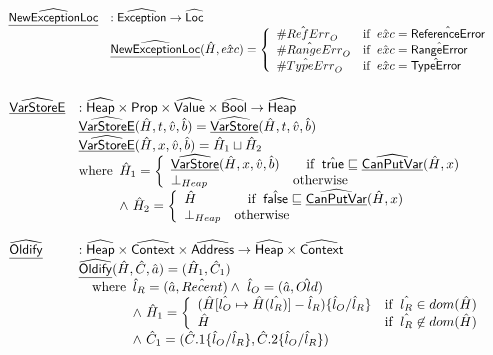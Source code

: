\documentclass{article}
\newcommand{\SF}[1]{\mbox{\textsf{#1}}}
\newcommand{\wherec}[1]{{\rm where}\begin{array}[t]{l}#1\end{array}}
\newcommand{\ifc}[1]{{\rm if}\begin{array}[t]{l}#1\end{array}}
\newcommand{\owc}{{\rm otherwise}}
\newcommand{\Prop}{\SF{Prop}}
\newcommand{\abs}[1]{\widehat{\SF{#1}}}
\newcommand{\aHeap}{\abs{Heap}}
\newcommand{\aValue}{\abs{Value}}
\newcommand{\ahf}[1]{\widehat{\underline{\sf #1}}}
\newcommand{\exc}[1]{{\sf #1}}
\newcommand{\avarloc}[1]{\hat{\##1}}
\newcommand{\atrue}{\hat{\SF{true}}}
\newcommand{\afalse}{\hat{\SF{false}}}
\begin{document}
\[\begin{array}{ll}
\ahf{NewExceptionLoc} & : \abs{Exception} \rightarrow \abs{Loc} \\
 & \ahf{NewExceptionLoc}(\hat{H},\hat{exc}) =
 \left\{
   \begin{array}{ll}
     \avarloc{RefErr}_O & \ifc{\hat{exc} = \hat{\exc{ReferenceError}}} \\
     \avarloc{RangeErr}_O & \ifc{\hat{exc} = \hat{\exc{RangeError}}} \\
     \avarloc{TypeErr}_O & \ifc{\hat{exc} = \hat{\exc{TypeError}}} \\
   \end{array}
 \right.\\
\\
\end{array}
\]
\[
\begin{array}{ll}
\ahf{VarStoreE} & : \aHeap \times \Prop \times \aValue \times \abs{Bool} \rightarrow \aHeap\\
& \ahf{VarStoreE}(\hat{H}, t, \hat{v}, \hat{b}) = \ahf{VarStore}(\hat{H}, t, \hat{v}, \hat{b}) \\
& \ahf{VarStoreE}(\hat{H}, x, \hat{v}, \hat{b}) = \hat{H}_1 \sqcup \hat{H}_2 \\
& \wherec{
  \hat{H}_1 = \left\{
    \begin{array}{ll}
      \ahf{VarStore}(\hat{H}, x, \hat{v}, \hat{b}) & \quad\ifc{\atrue\sqsubseteq\ahf{CanPutVar}(\hat{H}, x)} \\
      \bot_{Heap} & \owc
    \end{array}
  \right. \\
  \land\ \hat{H}_2 = \left\{
    \begin{array}{ll}
      \hat{H} & \quad\ifc{\afalse \sqsubseteq \ahf{CanPutVar}(\hat{H}, x)} \\
      \bot_{Heap} & \owc
    \end{array}
  \right. \\
} \\
\\
\ahf{Oldify} & : \aHeap \times \abs{Context} \times \abs{Address} \rightarrow \aHeap \times \abs{Context}\\
 & \ahf{Oldify}(\hat{H},\hat{C}, \hat{a}) = (\hat{H}_1, \hat{C}_1) \\
 & \quad\wherec{
   \hat{l}_R = (\hat{a}, \hat{Recent}) \land\ \hat{l}_O = (\hat{a}, \hat{Old})\\
   \land\ \hat{H}_1 =
     \left\{
       \begin{array}{ll}
         (\hat{H}[\hat{l_O}\mapsto \hat{H}(\hat{l_R})]-\hat{l}_R)\{\hat{l}_O / \hat{l}_R\}
         & \ifc{\hat{l_R}\in dom(\hat{H})} \\
         \hat{H}
         & \ifc{\hat{l_R}\not\in dom(\hat{H})} \\
       \end{array}
     \right.\\
   \land\ \hat{C}_1 = (\hat{C}.1\{\hat{l}_O / \hat{l}_R\}, \hat{C}.2\{\hat{l}_O / \hat{l}_R\})
}\\
\\

\end{array}
\]
\end{document}
